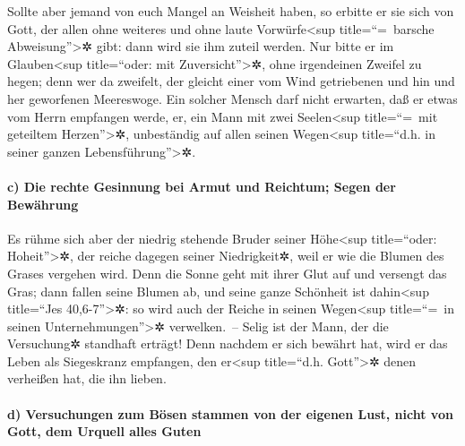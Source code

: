  Sollte aber jemand von euch Mangel an Weisheit haben, so
erbitte er sie sich von Gott, der allen ohne weiteres und ohne laute
Vorwürfe\textless sup title=``=~barsche Abweisung''\textgreater✲ gibt:
dann wird sie ihm zuteil werden.  Nur bitte er im
Glauben\textless sup title=``oder: mit Zuversicht''\textgreater✲, ohne
irgendeinen Zweifel zu hegen; denn wer da zweifelt, der gleicht einer
vom Wind getriebenen und hin und her geworfenen Meereswoge.
 Ein solcher Mensch darf nicht erwarten, daß er etwas vom
Herrn empfangen werde,  er, ein Mann mit zwei
Seelen\textless sup title=``=~mit geteiltem Herzen''\textgreater✲,
unbeständig auf allen seinen Wegen\textless sup title=``d.h. in seiner
ganzen Lebensführung''\textgreater✲.

\hypertarget{c-die-rechte-gesinnung-bei-armut-und-reichtum-segen-der-bewuxe4hrung}{%
\paragraph{c) Die rechte Gesinnung bei Armut und Reichtum; Segen der
Bewährung}\label{c-die-rechte-gesinnung-bei-armut-und-reichtum-segen-der-bewuxe4hrung}}

 Es rühme sich aber der niedrig stehende Bruder seiner
Höhe\textless sup title=``oder: Hoheit''\textgreater✲, 
der reiche dagegen seiner Niedrigkeit✲, weil er wie die Blumen des
Grases vergehen wird.  Denn die Sonne geht mit ihrer Glut
auf und versengt das Gras; dann fallen seine Blumen ab, und seine ganze
Schönheit ist dahin\textless sup title=``Jes 40,6-7''\textgreater✲: so
wird auch der Reiche in seinen Wegen\textless sup title=``=~in seinen
Unternehmungen''\textgreater✲ verwelken.~--  Selig ist
der Mann, der die Versuchung✲ standhaft erträgt! Denn nachdem er sich
bewährt hat, wird er das Leben als Siegeskranz empfangen, den
er\textless sup title=``d.h. Gott''\textgreater✲ denen verheißen hat,
die ihn lieben.

\hypertarget{d-versuchungen-zum-buxf6sen-stammen-von-der-eigenen-lust-nicht-von-gott-dem-urquell-alles-guten}{%
\paragraph{d) Versuchungen zum Bösen stammen von der eigenen Lust, nicht
von Gott, dem Urquell alles
Guten}\label{d-versuchungen-zum-buxf6sen-stammen-von-der-eigenen-lust-nicht-von-gott-dem-urquell-alles-guten}}

